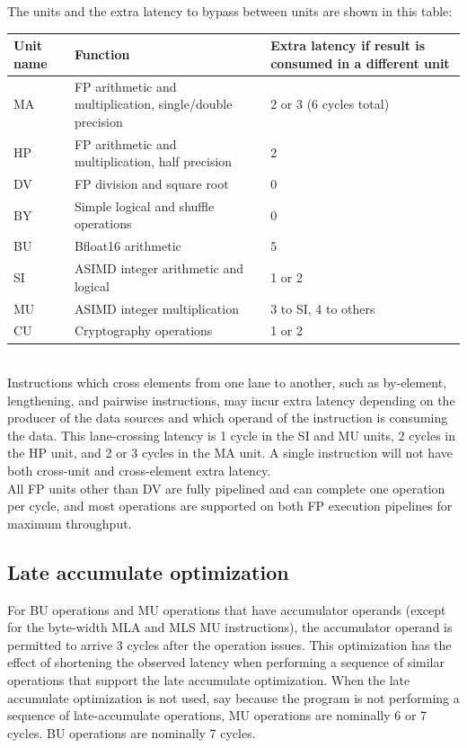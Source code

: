 \documentclass{article}
\begin{document}
The units and the extra latency to bypass between units are shown in this table: \\
\begin{tabular}{|l|l|p{2in}|}
\hline
{\bf Unit name} & {\bf Function}  & {\bf Extra latency if result is consumed in a different unit} \\ \hline
MA & FP arithmetic and multiplication, single/double precision & 2 or 3 (6 cycles total)  \\
HP & FP arithmetic and multiplication, half precision & 2  \\
DV & FP division and square root & 0  \\
BY & Simple logical and shuffle operations & 0  \\
BU & Bfloat16 arithmetic & 5  \\
SI & ASIMD integer arithmetic and logical & 1 or 2  \\
MU & ASIMD integer multiplication & 3 to SI, 4 to others  \\
CU & Cryptography operations & 1 or 2  \\ \hline
\end{tabular}
\\

Instructions which cross elements from one lane to another, such as
 by-element, lengthening, and pairwise instructions, may incur extra
 latency depending on the producer of the data sources and which
 operand of the instruction is consuming the data. This lane-crossing
 latency is 1 cycle in the SI and MU units, 2 cycles in the HP unit,
 and 2 or 3 cycles in the MA unit. A single instruction will not have
 both cross-unit and cross-element extra latency. \\

All FP units other than DV are fully pipelined and can complete one
 operation per cycle, and most operations are supported on both FP
 execution pipelines for maximum throughput. \\

 \subsection{Late accumulate optimization}

 For BU operations and MU operations that have accumulator operands
 (except for the byte-width MLA and MLS MU instructions), the
 accumulator operand is permitted to arrive 3 cycles after the
 operation issues.  This optimization has the effect of shortening the
 observed latency when performing a sequence of similar operations
 that support the late accumulate optimization.  When the late
 accumulate optimization is not used, say because the program is not
 performing a sequence of late-accumulate operations, MU operations
 are nominally 6 or 7 cycles. BU operations are nominally 7 cycles.
\end{document}
